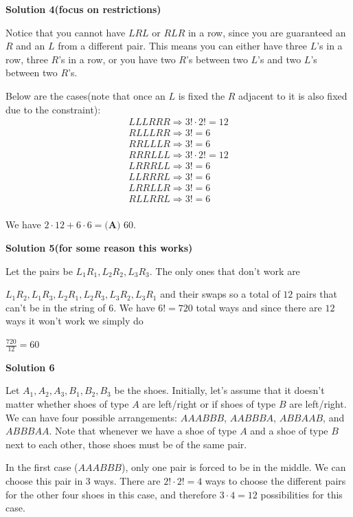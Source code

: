 \begin{enumerate}
\textbf{Solution 4(focus on restrictions)}

Notice that you cannot have $LRL$ or $RLR$ in a row, since you are guaranteed an $R$ and an $L$ from a different pair. This means you can either have three $L$'s in a row, three $R$'s in a row, or you have two $R$'s between two $L$'s and two $L$'s between two $R$'s. 

 Below are the cases(note that once an $L$ is fixed the $R$ adjacent to it is also fixed due to the constraint):\begin{align*}LLLRRR \Rightarrow 3!\cdot 2!=12\\RLLLRR \Rightarrow 3!=6\\RRLLLR \Rightarrow 3!=6\\RRRLLL \Rightarrow 3!\cdot 2!=12\\LRRRLL \Rightarrow 3!=6\\LLRRRL \Rightarrow 3!=6\\LRRLLR \Rightarrow 3!=6\\RLLRRL \Rightarrow 3!=6\\\end{align*}


 We have $2\cdot 12+6\cdot 6=\boxed{\textbf{(A) }60}.$




\textbf{Solution 5(for some reason this works)}

Let the pairs be $L_1 R_1, L_2 R_2, L_3 R_3$. The only ones that don't work are

 $L_1 R_2, L_1 R_3, L_2 R_1, L_2 R_3, L_3 R_2, L_3 R_1$ and their swaps so a total of $12$ pairs that can't be in the string of $6$. We have $6! = 720$ total ways and since there are $12$ ways it won't work we simply do

 $\frac{720}{12} = \boxed{60}$




\textbf{Solution 6}

Let $A_1, A_2, A_3, B_1, B_2, B_3$ be the shoes. Initially, let's assume that it doesn't matter whether shoes of type $A$ are left/right or if shoes of type $B$ are left/right. We can have four possible arrangements: $AAABBB$, $AABBBA$, $ABBAAB$, and $ABBBAA$. Note that whenever we have a shoe of type $A$ and a shoe of type $B$ next to each other, those shoes must be of the same pair.

 In the first case ($AAABBB$), only one pair is forced to be in the middle. We can choose this pair in $3$ ways. There are $2! \cdot 2! = 4$ ways to choose the different pairs for the other four shoes in this case, and therefore $3 \cdot 4 = 12$ possibilities for this case.


\end{enumerate}
